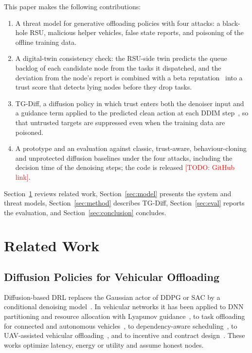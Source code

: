 \documentclass[journal]{IEEEtran}
\newcommand{\todo}[1]{\textcolor{red}{[TODO: #1]}}
\newcommand{\tgd}{TG-Diff}
\begin{document}
This paper makes the following contributions:
\begin{enumerate}
\item A threat model for generative offloading policies with four attacks: a black-hole RSU, malicious helper vehicles, false state reports, and poisoning of the offline training data.
\item A digital-twin consistency check: the RSU-side twin predicts the queue backlog of each candidate node from the tasks it dispatched, and the deviation from the node's report is combined with a beta reputation~\cite{josang2002beta} into a trust score that detects lying nodes before they drop tasks.
\item \tgd{}, a diffusion policy in which trust enters both the denoiser input and a guidance term applied to the predicted clean action at each DDIM step~\cite{song2021ddim}, so that untrusted targets are suppressed even when the training data are poisoned.
\item A prototype and an evaluation against classic, trust-aware, behaviour-cloning and unprotected diffusion baselines under the four attacks, including the decision time of the denoising steps; the code is released \todo{GitHub link}.
\end{enumerate}

Section~\ref{sec:related} reviews related work, Section~\ref{sec:model} presents the system and threat models, Section~\ref{sec:method} describes \tgd{}, Section~\ref{sec:eval} reports the evaluation, and Section~\ref{sec:conclusion} concludes.

\section{Related Work}\label{sec:related}

\subsection{Diffusion Policies for Vehicular Offloading}
Diffusion-based DRL replaces the Gaussian actor of DDPG or SAC by a conditional denoising model~\cite{wang2023diffusionql,luong2026denoising}. In vehicular networks it has been applied to DNN partitioning and resource allocation with Lyapunov guidance~\cite{S154}, to task offloading for connected and autonomous vehicles~\cite{S070,S095}, to dependency-aware scheduling~\cite{S126}, to UAV-assisted vehicular offloading~\cite{S032,S041}, and to incentive and contract design~\cite{S122}. These works optimize latency, energy or utility and assume honest nodes.
\end{document}
